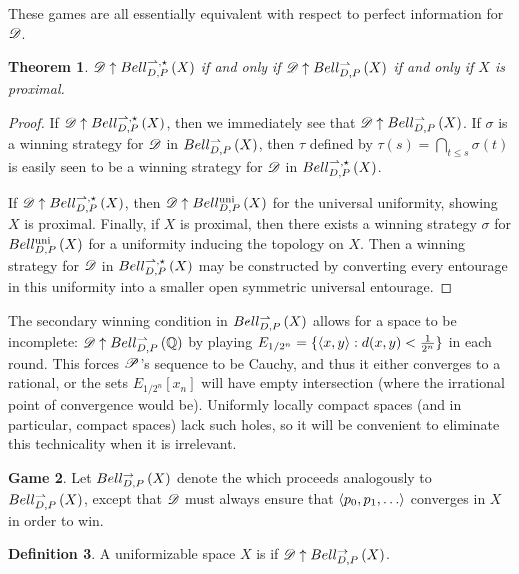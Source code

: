 \documentclass{amsart}
\newtheorem{theorem}{Theorem}[section]
\theoremstyle{definition}
\newtheorem{definition}[theorem]{Definition}
\newtheorem{game}[theorem]{Game}
\begin{document}
  These games are all essentially equivalent with respect to perfect
  information for \(\mathscr{D}\).

  \begin{theorem}
    \(\mathscr{D}\uparrow Bell_{D,P}^{\rightharpoonup,\star}\left({X}\right)\) if and only if
    \(\mathscr{D}\uparrow Bell_{D,P}^{\rightharpoonup}\left({X}\right)\) if and only if
    \(X\) is proximal.
  \end{theorem}

  \begin{proof}
    If \(\mathscr{D}\uparrow Bell_{D,P}^{\rightharpoonup,\star}\left({X}\right)\), then we immediately see that
    \(\mathscr{D}\uparrow Bell_{D,P}^{\rightharpoonup}\left({X}\right)\).
    If \(\sigma\) is a winning strategy for \(\mathscr{D}\)
    in \(Bell_{D,P}^{\rightharpoonup}\left({X}\right)\), then \(\tau\) defined by
    \(\tau(s)=\bigcap_{t\leq s}\sigma(t)\) is easily seen to be a winning
    strategy for \(\mathscr{D}\) in \(Bell_{D,P}^{\rightharpoonup,\star}\left({X}\right)\).

    If \(\mathscr{D}\uparrow Bell_{D,P}^{\rightharpoonup,\star}\left({X}\right)\), then \(\mathscr{D}\uparrow Bell_{D,P}^{\textrm{uni}}\left({X}\right)\)
    for the universal uniformity, showing \(X\) is proximal.
    Finally, if \(X\) is proximal, then there exists a winning strategy
    \(\sigma\) for \(Bell_{D,P}^{\textrm{uni}}\left({X}\right)\) for a uniformity inducing the
    topology on \(X\). Then a winning strategy for \(\mathscr{D}\) in
    \(Bell_{D,P}^{\rightharpoonup,\star}\left({X}\right)\) may be constructed by converting every
    entourage in this uniformity into a smaller open symmetric universal
    entourage.
  \end{proof}

  The secondary winning condition in \(Bell_{D,P}^{\rightharpoonup}\left({X}\right)\)
  allows for a space to be incomplete: \(\mathscr{D}\uparrow Bell_{D,P}^{\rightharpoonup}\left({\mathbb{Q}}\right)\) by
  playing \(E_{1/2^n}=\{\langle x,y\rangle:d(x,y)<\frac{1}{2^n}\}\) in each round. This
  forces \(\mathscr{P}\)'s sequence to be Cauchy, and thus it either converges to
  a rational, or the sets \(E_{1/2^n}[x_n]\) will have empty intersection
  (where the irrational point of convergence would be). Uniformly locally
  compact spaces (and in particular, compact spaces) lack such holes, so it
  will be convenient to eliminate this technicality when it is irrelevant.

  \begin{game}
    Let \(Bell_{D,P}^{\to}\left({X}\right)\) denote the
     which
    proceeds analogously to \(Bell_{D,P}^{\rightharpoonup}\left({X}\right)\), except
    that \(\mathscr{D}\) must always ensure that \(\<p_0,p_1,\dots\>\) converges
    in \(X\) in order to win.
  \end{game}

  \begin{definition}
    A uniformizable space \(X\) is  if
    \(\mathscr{D} \uparrow Bell_{D,P}^{\to}\left({X}\right)\).
  \end{definition}
\end{document}
